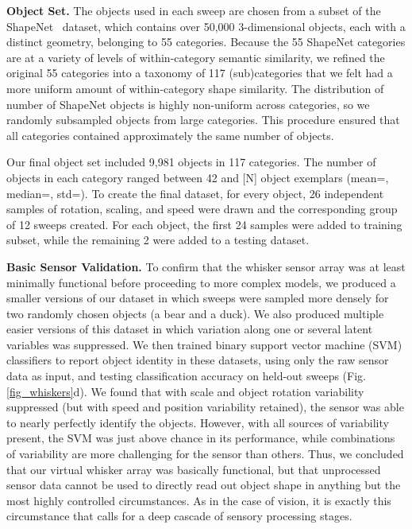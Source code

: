 \textbf{Object Set.} The objects used in each sweep are chosen from a subset of the ShapeNet~\cite{Chang2015} dataset, which contains over 50,000 3-dimensional objects, each with a distinct geometry, belonging to 55 categories.
Because the 55 ShapeNet categories are at a variety of levels of within-category semantic similarity, we refined the original 55 categories into a taxonomy of 117 (sub)categories that we felt had a more uniform amount of within-category shape similarity. 
The distribution of number of ShapeNet objects is highly non-uniform across categories, so we randomly subsampled objects from large categories.  
This procedure ensured that all categories contained approximately the same number of objects.  

Our final object set included 9,981 objects in 117 categories.  The number of objects in each category ranged between 42 and [N] object exemplars (mean=, median=, std=). 
To create the final dataset, for every object, 26 independent samples of rotation, scaling, and speed were drawn and the corresponding group of 12 sweeps created.   
For each object, the first 24 samples were added to training subset, while the remaining 2 were added to a testing dataset. 


\textbf{Basic Sensor Validation.} To confirm that the whisker sensor array was at least minimally functional before proceeding to more complex models, we produced a smaller versions of our dataset in which sweeps were sampled more densely for two randomly chosen objects (a bear and a duck).  
We also produced multiple easier versions of this dataset in which variation along one or several latent variables was suppressed. 
We then trained binary support vector machine (SVM) classifiers to report object identity in these datasets, using only the raw sensor data as input, and testing classification accuracy on held-out sweeps (Fig. \ref{fig_whiskers}d).  We found that with scale and object rotation variability suppressed (but with speed and position variability retained), the sensor was able to nearly perfectly identify the objects.  
However, with all sources of variability present, the SVM was just above chance in its performance,  
while combinations of variability are more challenging for the sensor than others. 
Thus, we concluded that our virtual whisker array was basically functional, but that unprocessed sensor data cannot be used to directly read out object shape in anything but the most highly controlled circumstances.
As in the case of vision, it is exactly this circumstance that calls for a deep cascade of sensory processing stages. 

